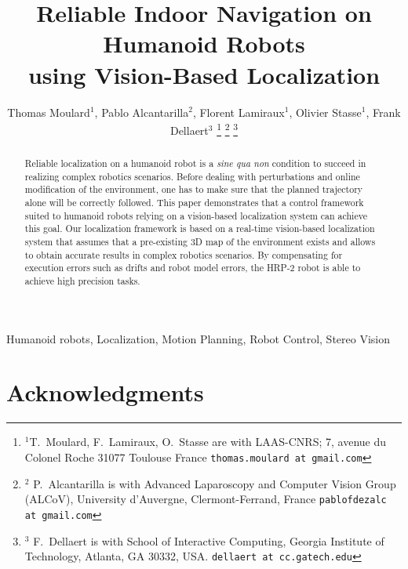 \documentclass[a4paper, 10pt, conference]{ieeeconf}
\title{\LARGE \bf Reliable Indoor Navigation on Humanoid Robots\\
  using Vision-Based Localization}
\author{Thomas Moulard$^{1}$, Pablo Alcantarilla$^{2}$, Florent Lamiraux$^{1}$, Olivier Stasse$^{1}$, Frank Dellaert$^{3}$%
\thanks{$^{1} $T.\ Moulard, F.\ Lamiraux, O.\ Stasse are with LAAS-CNRS; 7, avenue du Colonel Roche 31077 Toulouse France {\tt\small thomas.moulard at gmail.com}}%
\thanks{$^{2}$ P.\ Alcantarilla is with Advanced Laparoscopy and Computer Vision Group (ALCoV), University d'Auvergne, Clermont-Ferrand, France {\tt\small pablofdezalc at gmail.com}}%
\thanks{$^{3}$ F.\ Dellaert is with School of Interactive Computing, Georgia Institute of Technology, Atlanta, GA 30332, USA. {\tt\small dellaert at cc.gatech.edu}}%
}
\begin{document}
\maketitle
\thispagestyle{empty}
\pagestyle{empty}


\begin{abstract}
Reliable localization on a humanoid robot is a \textit{sine qua non} condition to succeed in realizing complex robotics scenarios. Before dealing with perturbations and online modification of the environment, one has to make sure that the planned trajectory alone will be correctly followed. This paper demonstrates that a control framework suited to humanoid robots relying on a vision-based localization system can achieve this goal. Our localization framework is based on a real-time vision-based localization system that assumes that a pre-existing 3D map of the environment exists and allows to obtain accurate results in complex robotics scenarios. By compensating for execution errors such as drifts and robot model errors, the HRP-2 robot is able to achieve high precision tasks. 
\end{abstract}

\begin{keywords}
  Humanoid robots, Localization, Motion Planning, Robot Control, Stereo Vision
\end{keywords}








\section*{Acknowledgments}



\end{document}
